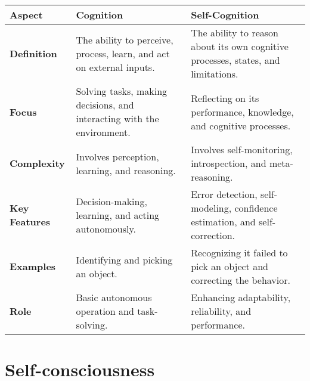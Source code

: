 \begin{tabular}{|l|l|l|}
        \hline
        \textbf{Aspect}         & \textbf{Cognition}                                & \textbf{Self-Cognition}                             \\ \hline
        \textbf{Definition}     & The ability to perceive, process, learn, and act on external inputs. & The ability to reason about its own cognitive processes, states, and limitations. \\ \hline
        \textbf{Focus}          & Solving tasks, making decisions, and interacting with the environment. & Reflecting on its performance, knowledge, and cognitive processes. \\ \hline
        \textbf{Complexity}     & Involves perception, learning, and reasoning.    & Involves self-monitoring, introspection, and meta-reasoning. \\ \hline
        \textbf{Key Features}   & Decision-making, learning, and acting autonomously. & Error detection, self-modeling, confidence estimation, and self-correction. \\ \hline
        \textbf{Examples}       & Identifying and picking an object.               & Recognizing it failed to pick an object and correcting the behavior. \\ \hline
        \textbf{Role}           & Basic autonomous operation and task-solving.     & Enhancing adaptability, reliability, and performance. \\ \hline
        \end{tabular}
\section{Self-consciousness}

